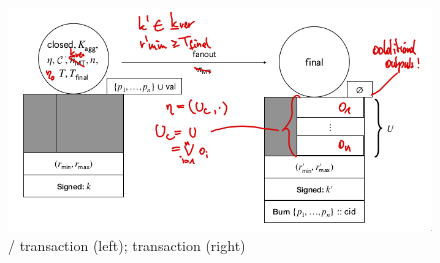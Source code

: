 \begin{figure}

  \centering

  \includegraphics[width=\textwidth/2]{figures/SM_closed_final.png}

  \caption{\mtxClose{}/\mtxContest{} transaction (left);
    \mtxFanout{} transaction (right)}\label{fig:SM_closed_final}

\end{figure}

